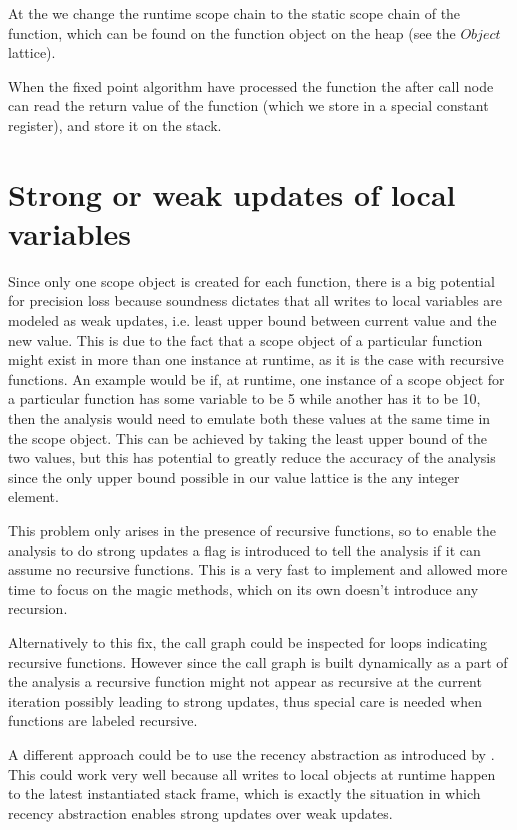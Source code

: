 At the  we change the runtime scope chain to the static scope chain of the function, which can be found on the function object on the heap (see the $Object$ lattice).

When the fixed point algorithm have processed the function the after call node can read the return value of the function (which we store in a special constant register), and store it on the stack.

\section{Strong or weak updates of local variables}
\label{section:Strong or weak}
Since only one scope object is created for each function, there is a big potential for precision loss because soundness dictates that all writes to local variables are modeled as weak updates, i.e. least upper bound between current value and the new value. This is due to the fact that a scope object of a particular function might exist in more than one instance at runtime, as it is the case with recursive functions. An example would be if, at runtime, one instance of a scope object for a particular function has some variable  to be 5 while another has it to be 10, then the analysis would need to emulate both these values at the same time in the scope object. This can be achieved by taking the least upper bound of the two values, but this has potential to greatly reduce the accuracy of the analysis since the only upper bound possible in our value lattice is the any integer element.

This problem only arises in the presence of recursive functions, so to enable the analysis to do strong updates a flag is introduced to tell the analysis if it can assume no recursive functions. This is a very fast to implement and allowed more time to focus on the magic methods, which on its own doesn't introduce any recursion.

Alternatively to this fix, the call graph could be inspected for loops indicating recursive functions. However since the call graph is built dynamically as a part of the analysis a recursive function might not appear as recursive at the current iteration possibly leading to strong updates, thus special care is needed when functions are labeled recursive.

A different approach could be to use the recency abstraction as introduced by \cite{recency}. This could work very well because all writes to local objects at runtime happen to the latest instantiated stack frame, which is exactly the situation in which recency abstraction enables strong updates over weak updates.

